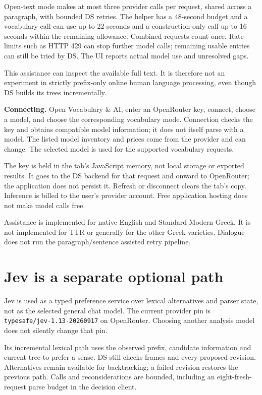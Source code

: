 \documentclass[11pt,a4paper]{article}
\begin{document}
Open-text mode makes at most three provider calls per request, shared
across a paragraph, with bounded DS retries. The helper has a 48-second
budget and a vocabulary call can use up to 22 seconds and a
construction-only call up to 16 seconds within the remaining allowance.
Combined requests count once. Rate limits such as HTTP 429 can stop
further model calls; remaining usable entries can still be tried by DS.
The UI reports actual model use and unresolved gaps.

This assistance can inspect the available full text. It is therefore not
an experiment in strictly prefix-only online human language processing,
even though DS builds its trees incrementally.

\textbf{Connecting.} Open Vocabulary \& AI, enter an OpenRouter key,
connect, choose a model, and choose the corresponding vocabulary mode.
Connection checks the key and obtains compatible model information; it
does not itself parse with a model. The listed model inventory and
prices come from the provider and can change. The selected model is used
for the supported vocabulary requests.

The key is held in the tab's JavaScript memory, not local storage or
exported results. It goes to the DS backend for that request and onward
to OpenRouter; the application does not persist it. Refresh or
disconnect clears the tab's copy. Inference is billed to the user's
provider account. Free application hosting does not make model calls
free.

Assistance is implemented for native English and Standard Modern Greek.
It is not implemented for TTR or generally for the other Greek
varieties. Dialogue does not run the paragraph/sentence assisted retry
pipeline.

\section{Jev is a separate optional
path}\label{jev-is-a-separate-optional-path}

Jev is used as a typed preference service over lexical alternatives and
parser state, not as the selected general chat model. The current
provider pin is \nolinkurl{typesafe/jev-1.13-20260917} on OpenRouter.
Choosing another analysis model does not silently change that pin.

Its incremental lexical path uses the observed prefix, candidate
information and current tree to prefer a sense. DS still checks frames
and every proposed revision. Alternatives remain available for
backtracking; a failed revision restores the previous path. Calls and
reconsiderations are bounded, including an eight-fresh-request parse
budget in the decision client.
\end{document}
